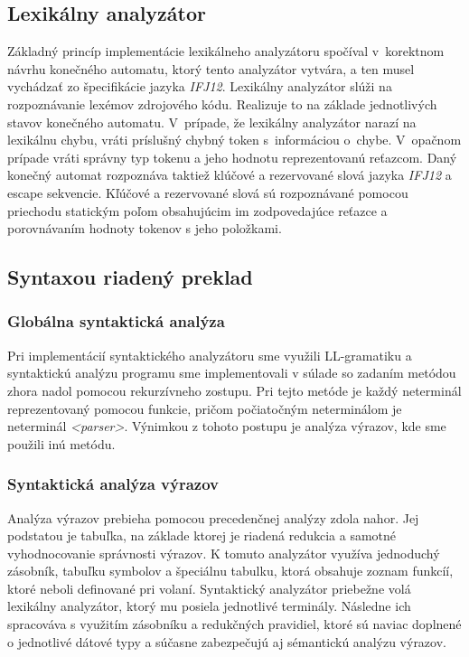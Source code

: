 \documentclass[12pt,a4paper,titlepage,final]{article}
\begin{document}
\subsection{Lexikálny analyzátor}
Základný princíp implementácie lexikálneho analyzátoru spočíval v~korektnom návrhu konečného automatu, ktorý tento analyzátor vytvára, a ten musel vychádzať zo špecifikácie jazyka \emph{IFJ12}. Lexikálny analyzátor slúži na rozpoznávanie lexémov zdrojového kódu. Realizuje to na základe jednotlivých stavov konečného automatu. V~prípade, že lexikálny analyzátor narazí na lexikálnu chybu, vráti príslušný chybný token s~informáciou o~chybe. V~opačnom prípade vráti správny typ tokenu a jeho hodnotu reprezentovanú reťazcom. Daný konečný automat rozpoznáva taktiež klúčové a rezervované slová jazyka \emph{IFJ12} a escape sekvencie. Kľúčové a rezervované slová sú rozpoznávané pomocou priechodu statickým poľom obsahujúcim im zodpovedajúce reťazce a porovnávaním hodnoty tokenov s jeho položkami.


\subsection{Syntaxou riadený preklad}
\subsubsection{Globálna syntaktická analýza}
Pri implementácií syntaktického analyzátoru sme využili LL-gramatiku a syntaktickú analýzu programu sme implementovali v súlade so zadaním metódou zhora nadol pomocou rekurzívneho zostupu. Pri tejto metóde je každý neterminál reprezentovaný pomocou funkcie, pričom počiatočným neterminálom je neterminál \emph{<parser>}. Výnimkou z tohoto postupu je analýza výrazov, kde sme použili inú metódu.

\subsubsection{Syntaktická analýza výrazov}
Analýza výrazov prebieha pomocou precedenčnej analýzy zdola nahor. Jej podstatou je tabuľka, na základe ktorej je riadená redukcia a samotné vyhodnocovanie správnosti výrazov. K tomuto analyzátor využíva jednoduchý zásobník, tabuľku symbolov a špeciálnu tabulku, ktorá obsahuje zoznam funkcíí, ktoré neboli definované pri volaní. Syntaktický analyzátor priebežne volá lexikálny analyzátor, ktorý mu posiela jednotlivé terminály. Následne ich spracováva s využitím zásobníku a redukčných pravidiel, ktoré sú naviac doplnené o jednotlivé dátové typy a súčasne zabezpečujú aj sémantickú analýzu výrazov.
\end{document}
